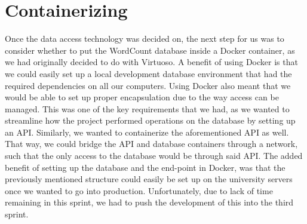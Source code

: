 \section{Containerizing}
Once the data access technology was decided on, the next step for us was to consider whether to put the WordCount database inside a Docker container, as we had originally decided to do with Virtuoso. A benefit of using Docker is that we could easily set up a local development database environment that had the required dependencies on all our computers. Using Docker also meant that we would be able to set up proper encapsulation due to the way access can be managed. This was one of the key requirements that we had, as we wanted to streamline how the \knox{} project performed operations on the database by setting up an API. 
Similarly, we wanted to containerize the aforementioned API as well. That way, we could bridge the API and database containers through a network, such that the only access to the database would be through said API.
The added benefit of setting up the database and the end-point in Docker, was that the previously mentioned structure could easily be set up on the university servers once we wanted to go into production.
Unfortunately, due to lack of time remaining in this sprint, we had to push the development of this into the third sprint.